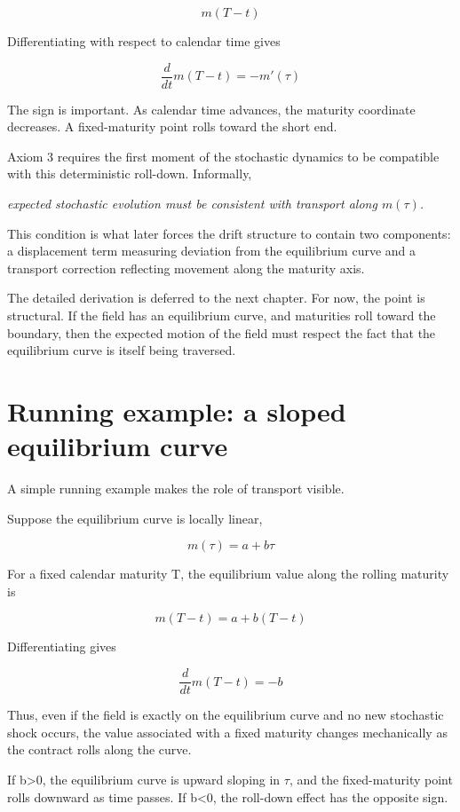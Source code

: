 \documentclass[11pt,oneside]{book}
\begin{document}
\[
m(T-t)
\]

Differentiating with respect to calendar time gives

\[
\frac{d}{dt} m(T-t) = -m'(\tau)
\]

The sign is important. As calendar time advances, the maturity
coordinate decreases. A fixed-maturity point rolls toward the short end.

Axiom 3 requires the first moment of the stochastic dynamics to be
compatible with this deterministic roll-down. Informally,

\begin{center}\emph{expected stochastic evolution must be consistent with transport along \(m(\tau)\).}\end{center}

This condition is what later forces the drift structure to contain two
components: a displacement term measuring deviation from the equilibrium
curve and a transport correction reflecting movement along the maturity
axis.

The detailed derivation is deferred to the next chapter. For now, the
point is structural. If the field has an equilibrium curve, and
maturities roll toward the boundary, then the expected motion of the
field must respect the fact that the equilibrium curve is itself being
traversed.

\section{Running example: a sloped equilibrium
curve}\label{running-example-a-sloped-equilibrium-curve}

A simple running example makes the role of transport visible.

Suppose the equilibrium curve is locally linear,

\[
m(\tau) = a + b\tau
\]

For a fixed calendar maturity T, the equilibrium value along the rolling
maturity is

\[
m(T-t) = a + b(T-t)
\]

Differentiating gives

\[
\frac{d}{dt} m(T-t) = -b
\]

Thus, even if the field is exactly on the equilibrium curve and no new
stochastic shock occurs, the value associated with a fixed maturity
changes mechanically as the contract rolls along the curve.

If b\textgreater0, the equilibrium curve is upward sloping in $\tau$, and the
fixed-maturity point rolls downward as time passes. If b\textless0, the
roll-down effect has the opposite sign.
\end{document}
